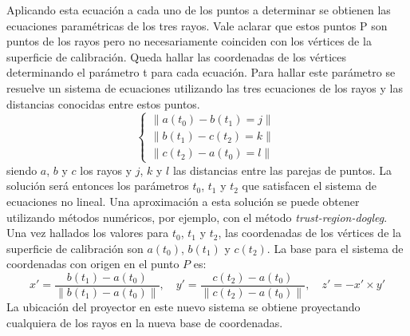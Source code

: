 Aplicando esta ecuación a cada uno de los puntos a determinar se obtienen las ecuaciones paramétricas de los tres rayos. Vale aclarar que estos puntos P son puntos de los rayos pero no necesariamente coinciden con los vértices de la superficie de calibración. Queda hallar las coordenadas de los vértices determinando el parámetro t para cada ecuación. Para hallar este parámetro se resuelve un sistema de ecuaciones utilizando las tres ecuaciones de los rayos y las distancias conocidas entre estos puntos.
\[
\begin{cases}
\lVert{a(t_0) - b(t_1)} = j\rVert \\
\lVert{b(t_1) - c(t_2)} = k\rVert \\
\lVert{c(t_2) - a(t_0)} = l\rVert
\end{cases}
\]
siendo $a$, $b$ y $c$ los rayos y $j$, $k$ y $l$ las distancias entre las parejas de puntos.
La solución será entonces los parámetros $t_0$, $t_1$ y $t_2$ que satisfacen el sistema de ecuaciones no lineal.
Una aproximación a esta solución se puede obtener utilizando métodos numéricos, por ejemplo, con el método \emph{trust-region-dogleg}\cite{TrustRegionDogleg}.
Una vez hallados los valores para $t_0$, $t_1$ y $t_2$, las coordenadas de los vértices de la superficie de calibración son $a(t_0)$, $b(t_1)$ y $c(t_2)$.
La base para el sistema de coordenadas con origen en el punto $P$ es:
\[
x' = \frac{b(t_1) - a(t_0)}{\lVert b(t_1) - a(t_0) \rVert},\quad y' = \frac{c(t_2) - a(t_0)}{\lVert c(t_2) - a(t_0)\rVert},\quad z' = -x' \times y'
\]
La ubicación del proyector en este nuevo sistema se obtiene proyectando cualquiera de los rayos en la nueva base de coordenadas.